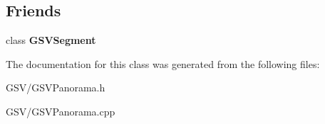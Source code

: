 \subsection*{Friends}
\begin{DoxyCompactItemize}
\item 
class {\bfseries G\+S\+V\+Segment}\hypertarget{class_g_s_v_panorama_a24c71f4a2a67fb7c97d76dffafabda73}{}\label{class_g_s_v_panorama_a24c71f4a2a67fb7c97d76dffafabda73}

\end{DoxyCompactItemize}


The documentation for this class was generated from the following files\+:\begin{DoxyCompactItemize}
\item 
G\+S\+V/G\+S\+V\+Panorama.\+h\item 
G\+S\+V/G\+S\+V\+Panorama.\+cpp\end{DoxyCompactItemize}
